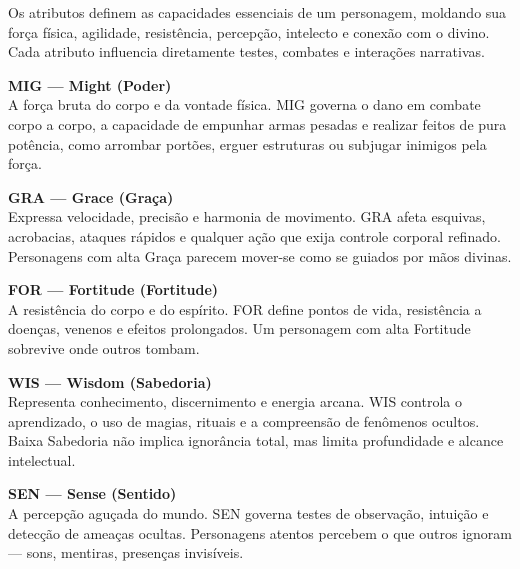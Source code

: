 
Os atributos definem as capacidades essenciais de um personagem, moldando sua força física, agilidade, resistência, percepção, intelecto e conexão com o divino.  
Cada atributo influencia diretamente testes, combates e interações narrativas.

\noindent


\noindent
\textbf{\baskerfamily\large MIG — Might (Poder)}\\
A força bruta do corpo e da vontade física. MIG governa o dano em combate corpo a corpo, a capacidade de empunhar armas pesadas e realizar feitos de pura potência, como arrombar portões, erguer estruturas ou subjugar inimigos pela força.


\noindent
\textbf{\baskerfamily\large GRA — Grace (Graça)}\\
Expressa velocidade, precisão e harmonia de movimento. GRA afeta esquivas, acrobacias, ataques rápidos e qualquer ação que exija controle corporal refinado. Personagens com alta Graça parecem mover-se como se guiados por mãos divinas.

\noindent
\textbf{\baskerfamily\large FOR — Fortitude (Fortitude)}\\
A resistência do corpo e do espírito. FOR define pontos de vida, resistência a doenças, venenos e efeitos prolongados. Um personagem com alta Fortitude sobrevive onde outros tombam.

\noindent
\textbf{\baskerfamily\large WIS — Wisdom (Sabedoria)}\\
Representa conhecimento, discernimento e energia arcana. WIS controla o aprendizado, o uso de magias, rituais e a compreensão de fenômenos ocultos. Baixa Sabedoria não implica ignorância total, mas limita profundidade e alcance intelectual.

\noindent
\textbf{\baskerfamily\large SEN — Sense (Sentido)}\\
A percepção aguçada do mundo. SEN governa testes de observação, intuição e detecção de ameaças ocultas. Personagens atentos percebem o que outros ignoram — sons, mentiras, presenças invisíveis.


